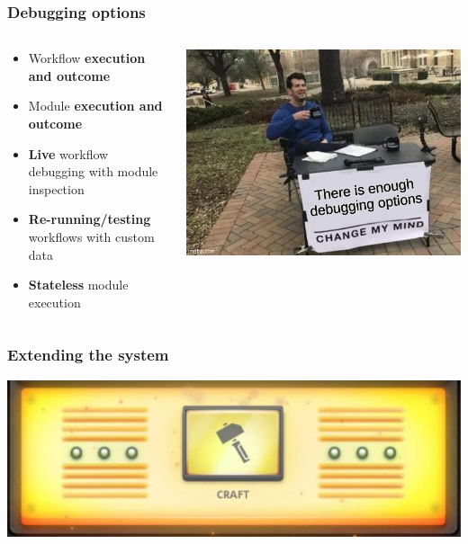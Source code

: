 \begin{frame}
    \frametitle{Debugging options}
    \begin{columns}
        \begin{column}{0.6\textwidth}
            \begin{itemize}
                \item Workflow \textbf{execution and outcome}
                \item Module \textbf{execution and outcome}
                \item \textbf{Live} workflow debugging with module inspection
                \item \textbf{Re-running/testing} workflows with custom data
                \item \textbf{Stateless} module execution
            \end{itemize}
        \end{column}
        \begin{column}{0.4\textwidth}
            \includegraphics[width=1.0\linewidth]{pictures/enough-debugging.jpg}
        \end{column}
    \end{columns}
\end{frame}

\begin{frame}
    \frametitle{
        \huge
        Extending the system
        \vspace{1em}
    }
    \begin{center}
        \includegraphics[width=0.6\linewidth]{pictures/craft.jpg}
    \end{center}
\end{frame}

